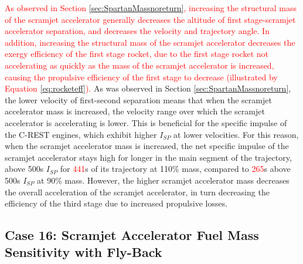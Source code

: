\textcolor{red}{
As observed in Section \ref{sec:SpartanMassnoreturn}, increasing the structural mass of the scramjet accelerator generally decreases the altitude of first stage-scramjet accelerator separation, and decreases the velocity and trajectory angle. 
In addition, increasing the structural mass of the scramjet accelerator decreases the exergy efficiency of the first stage rocket, due to the first stage rocket not accelerating as quickly as the mass of the scramjet accelerator is increased, causing the propulsive efficiency of the first stage to decrease (illustrated by Equation \ref{eq:rocketeff}).}
 As was observed in Section \ref{sec:SpartanMassnoreturn}, the lower velocity of first-second separation means that when the scramjet accelerator mass is increased, the velocity range over which the scramjet accelerator is accelerating is lower. This is beneficial for the specific impulse of the C-REST engines, which exhibit higher $I_{SP}$ at lower velocities. For this reason, when the scramjet accelerator mass is increased, the net specific impulse of the scramjet accelerator stays high for longer in the main segment of the trajectory, above 500s $I_{SP}$ for \textcolor{red}{441}s of its trajectory at 110\% mass, compared to \textcolor{red}{265}s above 500s $I_{SP}$ at 90\% mass. 
However, the higher scramjet accelerator mass decreases the overall acceleration of the scramjet accelerator, in turn decreasing the efficiency of the third stage due to increased propulsive losses.


\subsection{Case 16: Scramjet Accelerator Fuel Mass Sensitivity with Fly-Back}

